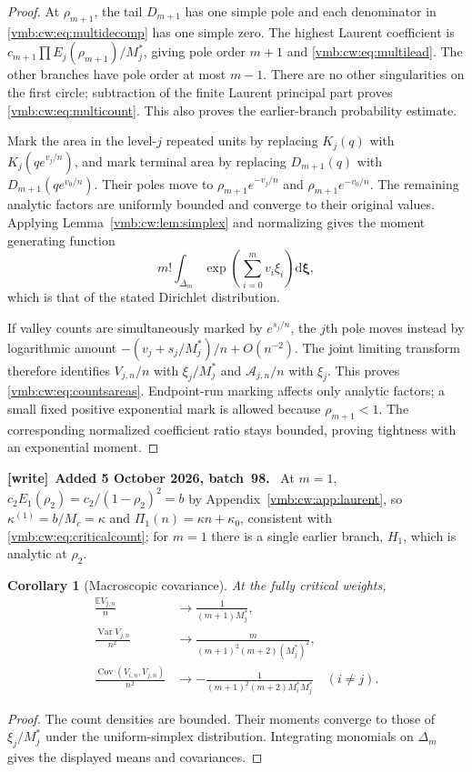 \documentclass[11pt,a4paper]{article}
\numberwithin{equation}{section}
\newtheorem{corollary}[theorem]{Corollary}
\theoremstyle{definition}\newtheorem{definition}[theorem]{Definition}
\theoremstyle{remark}\newtheorem{remark}[theorem]{Remark}
\newcommand{\E}{\mathbb E}
\newcommand{\Var}{\operatorname{Var}}
\newcommand{\dd}{\mathrm d}
\newcommand{\Cov}{\operatorname{Cov}}
\newenvironment{writenote}[1][]{\par\smallskip\begingroup\small
 \noindent\textbf{[write]}\if\relax\detokenize{#1}\relax\else~\textbf{#1.}\fi\ }%
 {\par\endgroup\smallskip}
\begin{document}
\begin{proof}
At $\rho_{m+1}$, the tail $D_{m+1}$ has one simple pole and each denominator in
\eqref{vmb:cw:eq:multidecomp} has one simple zero. The highest Laurent coefficient
is
$c_{m+1}\prod E_j(\rho_{m+1})/M_j^*$, giving pole order $m+1$ and
\eqref{vmb:cw:eq:multilead}. The other branches have pole order at most $m-1$.
There are no other singularities on the first circle; subtraction of the
finite Laurent principal part proves \eqref{vmb:cw:eq:multicount}. This also proves
the earlier-branch probability estimate.

Mark the area in the level-$j$ repeated units by replacing $K_j(q)$ with
$K_j(qe^{v_j/n})$, and mark terminal area by replacing $D_{m+1}(q)$ with
$D_{m+1}(qe^{v_0/n})$. Their poles move to
$\rho_{m+1}e^{-v_j/n}$ and $\rho_{m+1}e^{-v_0/n}$. The remaining analytic factors are
uniformly bounded and converge to their original values. Applying
Lemma~\ref{vmb:cw:lem:simplex} and normalizing gives the moment generating function
\[
 m!\int_{\Delta_m}\exp\left(\sum_{i=0}^m v_i\xi_i\right)\dd\bm \xi,
\]
which is that of the stated Dirichlet distribution.

If valley counts are simultaneously marked by $e^{s_j/n}$, the $j$th pole
moves instead by logarithmic amount
$-(v_j+s_j/M_j^*)/n+O(n^{-2})$. The joint limiting transform therefore
identifies $V_{j,n}/n$ with $\xi_j/M_j^*$ and $\mathcal A_{j,n}/n$ with $\xi_j$.
This proves \eqref{vmb:cw:eq:countsareas}. Endpoint-run marking affects only
analytic factors; a small fixed positive exponential mark is allowed
because $\rho_{m+1}<1$. The corresponding normalized coefficient ratio stays
bounded, proving tightness with an exponential moment.
\end{proof}

\begin{writenote}[Added 5 October 2026, batch~98]
At $m=1$, $c_2E_1(\rho_2)=c_2/(1-\rho_2)^2=b$ by
Appendix~\ref{vmb:cw:app:laurent}, so $\kappa^{(1)}=b/M_c=\kappa$ and
$\Pi_1(n)=\kappa n+\kappa_0$, consistent with
\eqref{vmb:cw:eq:criticalcount}; for $m=1$ there is a single earlier branch,
$H_1$, which is analytic at $\rho_2$.
\end{writenote}

\begin{corollary}[Macroscopic covariance]\label{vmb:cw:cor:cov}
At the fully critical weights,
\begin{align}
 \frac{\E V_{j,n}}n&\longrightarrow\frac1{(m+1)M_j^*},\\
 \frac{\Var V_{j,n}}{n^2}&\longrightarrow
 \frac{m}{(m+1)^2(m+2)(M_j^*)^2},\\
 \frac{\Cov(V_{i,n},V_{j,n})}{n^2}&\longrightarrow
 -\frac1{(m+1)^2(m+2)M_i^*M_j^*}\quad(i\ne j).
\end{align}
\end{corollary}
\begin{proof}
The count densities are bounded. Their moments converge to those of
$\xi_j/M_j^*$ under the uniform-simplex distribution. Integrating monomials
on $\Delta_m$ gives the displayed means and covariances.
\end{proof}
\end{document}
